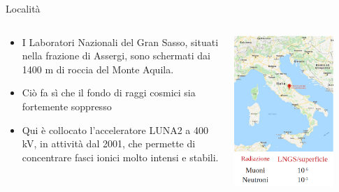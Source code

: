 \documentclass [xcolor=svgnames] {beamer}
\begin{document}
	\begin{frame}{Località}
		\begin{columns}
			\begin{column}{0.5\textwidth}
				\begin{itemize}
					\item I Laboratori Nazionali del Gran Sasso, situati nella frazione di Assergi, sono schermati dai 1400 m di roccia del Monte Aquila.
					\item Ciò fa sì che il fondo di raggi cosmici sia fortemente soppresso
					\item Qui è collocato l'acceleratore LUNA2 a 400 kV, in attività dal 2001, che permette di concentrare fasci ionici molto intensi e stabili.
				\end{itemize}
			\end{column}
			\begin{column}{0.5\textwidth}
				\centering
				\includegraphics[width=0.8\textwidth]{img/location.png}
			\end{column}
		\end{columns}
	\end{frame}
	
\end{document}
